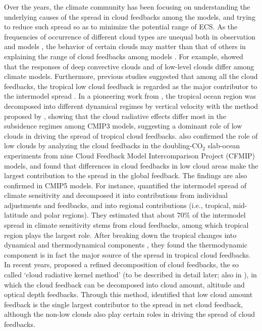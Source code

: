 Over the years, the climate community has been focusing on understanding the underlying causes of the spread in cloud feedbacks among the models, and trying to reduce such spread so as to minimize the potential range of ECS. As the frequencies of occurrence of different cloud types are unequal both in observation and models \citep[e.g.,][]{Zhang2005comparing}, the behavior of certain clouds may matter than that of others in explaining the range of cloud feedbacks among models \citep{Bony2006}. For example, \cite{Wyant2006comparison} showed that the responses of deep convective clouds and of low-level clouds differ among climate models. Furthermore, previous studies suggested that among all the cloud feedbacks, the tropical low cloud feedback is regarded as the major contributor to the intermodel spread \citep[e.g.,][]{Bony2005,Webb2006contribution,Webb2013coupling,Vial2013,Zelinka2016insights}. In a pioneering work from \cite{Bony2005}, the tropical ocean region was decomposed into different dynamical regimes by vertical velocity with the method proposed by \cite{Bony2004}, showing that the cloud radiative effects differ most in the subsidence regimes among CMIP3 models, suggesting a dominant role of low clouds in driving the spread of tropical cloud feedbacks. \cite{Webb2006contribution} also confirmed the role of low clouds by analyzing the cloud feedbacks in the doubling-CO$_2$ slab-ocean experiments from nine Cloud Feedback Model Intercomparison Project (CFMIP) models, and found that differences in cloud feedbacks in low cloud areas make the largest contribution to the spread in the global feedback. The findings are also confirmed in CMIP5 models. For instance, \cite{Vial2013} quantified the intermodel spread of climate sensitivity and decomposed it into contributions from individual adjustments and feedbacks, and into regional contributions (i.e., tropical, mid-latitude and polar regions). They estimated that about 70\% of the intermodel spread in climate sensitivity stems from cloud feedbacks, among which tropical region plays the largest role. After breaking down the tropical changes into dynamical and thermodynamical components \citep[method from][]{Bony2004}, they found the thermodynamic component is in fact the major source of the spread in tropical cloud feedbacks. In recent years, \cite{Zelinka2012computing1,Zelinka2012computing2} proposed a refined decomposition of cloud feedbacks, the so called `cloud radiative kernel method' (to be described in detail later; also in ), in which the cloud feedback can be decomposed into cloud amount, altitude and optical depth feedbacks. Through this method, \cite{Zelinka2016insights} identified that low cloud amount feedback is the single largest contributor to the spread in net cloud feedback, although the non-low clouds also play certain roles in driving the spread of cloud feedbacks.

